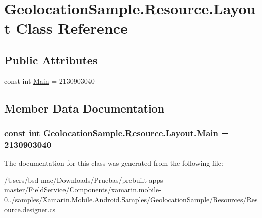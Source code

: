 \hypertarget{class_geolocation_sample_1_1_resource_1_1_layout}{\section{Geolocation\+Sample.\+Resource.\+Layout Class Reference}
\label{class_geolocation_sample_1_1_resource_1_1_layout}
}
\subsection*{Public Attributes}
\begin{DoxyCompactItemize}
\item 
const int \hyperlink{class_geolocation_sample_1_1_resource_1_1_layout_ae0d2a23374ae123e56ce8fa4bd0abcc7}{Main} = 2130903040
\end{DoxyCompactItemize}


\subsection{Member Data Documentation}
\hypertarget{class_geolocation_sample_1_1_resource_1_1_layout_ae0d2a23374ae123e56ce8fa4bd0abcc7}{
\subsubsection[{Main}]{\setlength{\rightskip}{0pt plus 5cm}const int Geolocation\+Sample.\+Resource.\+Layout.\+Main = 2130903040}}\label{class_geolocation_sample_1_1_resource_1_1_layout_ae0d2a23374ae123e56ce8fa4bd0abcc7}


The documentation for this class was generated from the following file\+:\begin{DoxyCompactItemize}
\item 
/\+Users/bsd-\/mac/\+Downloads/\+Pruebas/prebuilt-\/apps-\/master/\+Field\+Service/\+Components/xamarin.\+mobile-\/0../samples/\+Xamarin.\+Mobile.\+Android.\+Samples/\+Geolocation\+Sample/\+Resources/\hyperlink{_components_2xamarin_8mobile-0_86_81_2samples_2_xamarin_8_mobile_8_android_8_samples_2_geolocati70c310c330f4a850881b004033a4fa1f}{Resource.\+designer.\+cs}\end{DoxyCompactItemize}
